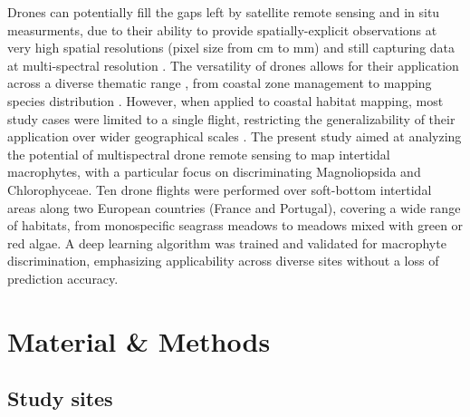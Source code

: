 \documentclass[
  number]{elsarticle}
\begin{document}
Drones can potentially fill the gaps left by satellite remote sensing
and in situ measurments, due to their ability to provide
spatially-explicit observations at very high spatial resolutions (pixel
size from cm to mm) and still capturing data at multi-spectral
resolution \citetext{\citealp[
]{fairley2022drone}; \citealp{oh2017use}}. The versatility of drones
allows for their application across a diverse thematic range , from
coastal zone management \citetext{\citealp[ ]{adade2021}; \citealp[
]{casella2020}; \citealp{angnuureng2022}} to mapping species
distribution \citetext{\citealp[ ]{joyce2023}; \citealp[
]{tallam2023}; \citealp[ ]{Roca2022}; \citealp[
]{Roman2021}; \citealp{Brunier2022Topographic}}. However, when applied
to coastal habitat mapping, most study cases were limited to a single
flight, restricting the generalizability of their application over wider
geographical scales \citetext{\citealp[ ]{Roman2021}; \citealp[
]{collin2019improving}; \citealp[
]{rossiter2020uav}; \citealp{Brunier2022Topographic}}. The present study
aimed at analyzing the potential of multispectral drone remote sensing
to map intertidal macrophytes, with a particular focus on discriminating
Magnoliopsida and Chlorophyceae. Ten drone flights were performed over
soft-bottom intertidal areas along two European countries (France and
Portugal), covering a wide range of habitats, from monospecific seagrass
meadows to meadows mixed with green or red algae. A deep learning
algorithm was trained and validated for macrophyte discrimination,
emphasizing applicability across diverse sites without a loss of
prediction accuracy.

\section{Material \& Methods}\label{material-methods}

\subsection{Study sites}\label{study-sites}
\end{document}
